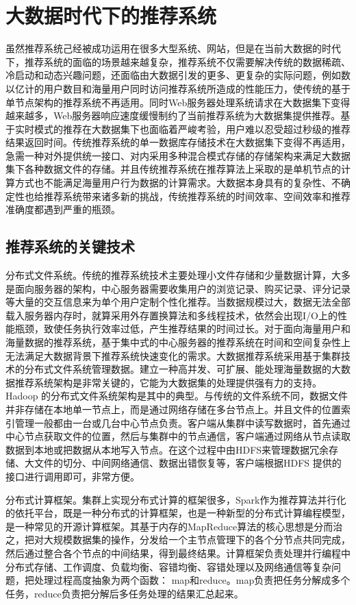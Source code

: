 \section{大数据时代下的推荐系统}
	虽然推荐系统己经被成功运用在很多大型系统、网站，但是在当前大数据的时代下，推荐系统的面临的场景越来越复杂，推荐系统不仅需要解决传统的数据稀疏、冷启动和动态兴趣问题，还面临由大数据引发的更多、更复杂的实际问题，例如数以亿计的用户数目和海量用户同时访问推荐系统所造成的性能压力，使传统的基于单节点架构的推荐系统不再适用。同时Web服务器处理系统请求在大数据集下变得越来越多，Web服务器响应速度缓慢制约了当前推荐系统为大数据集提供推荐。基于实时模式的推荐在大数据集下也面临着严峻考验，用户难以忍受超过秒级的推荐结果返回时间。传统推荐系统的单一数据库存储技术在大数据集下变得不再适用，急需一种对外提供统一接口、对内采用多种混合模式存储的存储架构来满足大数据集下各种数据文件的存储。并且传统推荐系统在推荐算法上采取的是单机节点的计算方式也不能满足海量用户行为数据的计算需求。大数据本身具有的复杂性、不确定性也给推荐系统带来诸多新的挑战，传统推荐系统的时间效率、空间效率和推荐准确度都遇到严重的瓶颈。

	\subsection{推荐系统的关键技术}
	分布式文件系统。传统的推荐系统技术主要处理小文件存储和少量数据计算，大多是面向服务器的架构，中心服务器需要收集用户的浏览记录、购买记录、评分记录等大量的交互信息来为单个用户定制个性化推荐。当数据规模过大，数据无法全部载入服务器内存时，就算采用外存置换算法和多线程技术，依然会出现I/O上的性能瓶颈，致使任务执行效率过低，产生推荐结果的时间过长。对于面向海量用户和海量数据的推荐系统，基于集中式的中心服务器的推荐系统在时间和空间复杂性上无法满足大数据背景下推荐系统快速变化的需求。大数据推荐系统采用基于集群技术的分布式文件系统管理数据。建立一种高并发、可扩展、能处理海量数据的大数据推荐系统架构是非常关键的，它能为大数据集的处理提供强有力的支持。Hadoop 的分布式文件系统架构是其中的典型。与传统的文件系统不同，数据文件并非存储在本地单一节点上，而是通过网络存储在多台节点上。并且文件的位置索引管理一般都由一台或几台中心节点负责。客户端从集群中读写数据时，首先通过中心节点获取文件的位置，然后与集群中的节点通信，客户端通过网络从节点读取数据到本地或把数据从本地写入节点。在这个过程中由HDFS来管理数据冗余存储、大文件的切分、中间网络通信、数据出错恢复等，客户端根据HDFS 提供的接口进行调用即可，非常方便。
	
	分布式计算框架。集群上实现分布式计算的框架很多，Spark作为推荐算法并行化的依托平台，既是一种分布式的计算框架，也是一种新型的分布式计算编程模型，是一种常见的开源计算框架。其基于内存的MapReduce算法的核心思想是分而治之，把对大规模数据集的操作，分发给一个主节点管理下的各个分节点共同完成，然后通过整合各个节点的中间结果，得到最终结果。计算框架负责处理并行编程中分布式存储、工作调度、负载均衡、容错均衡、容错处理以及网络通信等复杂问题，把处理过程高度抽象为两个函数： map和reduce。map负责把任务分解成多个任务，reduce负责把分解后多任务处理的结果汇总起来。
	
